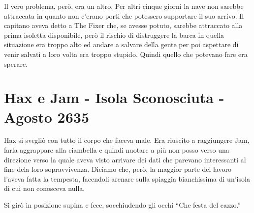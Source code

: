     Il vero problema, però, era un altro. Per altri cinque giorni la nave
    non sarebbe attraccata in quanto non c'erano porti che potessero
    supportare il suo arrivo. Il capitano aveva detto a The Fixer che, se
    avesse potuto, sarebbe attraccato alla prima isoletta disponibile, però
    il rischio di distruggere la barca in quella situazione era troppo alto
    ed andare a salvare della gente per poi aspettare di venir salvati a
    loro volta era troppo stupido. Quindi quello che potevano fare era sperare.

  \section{Hax e Jam - Isola Sconosciuta - Agosto 2635}

    Hax si svegliò con tutto il corpo che faceva male. Era riuscito a
    raggiungere Jam, farla aggrappare alla ciambella e quindi nuotare a più
    non posso verso una direzione verso la quale aveva visto arrivare dei
    dati che parevano interessanti al fine dela loro sopravvivenza. Diciamo
    che, però, la maggior parte del lavoro l'aveva fatta la tempesta,
    facendoli arenare sulla spiaggia bianchissima di un'isola di cui non
    conosceva nulla.

    Si girò in posizione supina e fece, socchiudendo gli occhi ``Che festa
    del cazzo.''

\cleardoublepage{}
